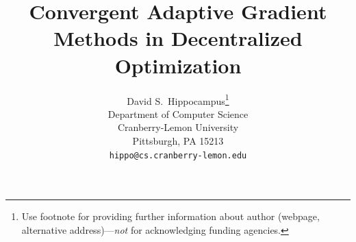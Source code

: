\documentclass{article} %
\title{Convergent Adaptive Gradient Methods in Decentralized Optimization}
\begin{document}
\maketitle


\author{%
  David S.~Hippocampus\thanks{Use footnote for providing further information
    about author (webpage, alternative address)---\emph{not} for acknowledging
    funding agencies.} \\
  Department of Computer Science\\
  Cranberry-Lemon University\\
  Pittsburgh, PA 15213 \\
  \texttt{hippo@cs.cranberry-lemon.edu} \\
}
\end{document}

